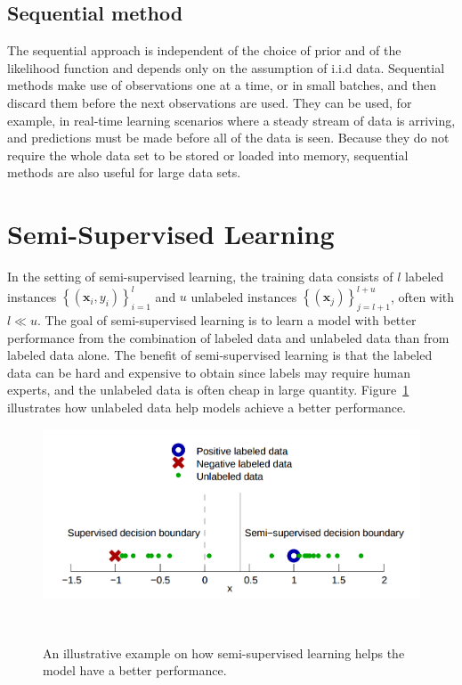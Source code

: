 \documentclass{article}
\begin{document}
\subsection{Sequential method}
The sequential approach is independent of the choice of prior and of
the likelihood function and depends only on the assumption of i.i.d
data. Sequential methods make use of observations one at a time, or in
small batches, and then discard them before the next observations are
used. They can be used, for example, in real-time learning scenarios
where a steady stream of data is arriving, and predictions must be
made before all of the data is seen. Because they do not require the
whole data set to be stored or loaded into memory, sequential methods
are also useful for large data sets.

\section{Semi-Supervised Learning}
In the setting of semi-supervised learning, the training data consists
of $l$ labeled instances $\left \{ (\mathbf{x}_i, y_i)
\right \}_{i=1}^{l}$ and $u$ unlabeled instances $\left \{ (\mathbf{x}_j)
\right \}_{j=l+1}^{l+u}$, often with $l \ll u$. The goal of
semi-supervised learning is to learn a model with better performance
from the combination of labeled data and unlabeled data than from
labeled data alone. The benefit of semi-supervised learning is that
the labeled data can be hard and expensive to obtain since labels may
require human experts, and the unlabeled data is often cheap in large
quantity. Figure~\ref{fg:ssl_model} illustrates how unlabeled data
help models achieve a better performance.

\begin{figure}[h] 
  \centering
  \includegraphics[width=0.95\columnwidth]{ssl.png}
  \caption{An illustrative example on how semi-supervised learning helps
    the model have a better performance.}~\label{fg:ssl_model}
\end{figure}
\end{document}
